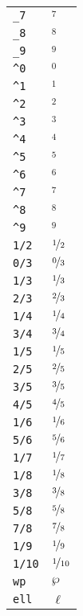 \begin{longtable}{ll}
\texttt{\_7}&${}_7 {}$\\
\texttt{\_8}&${}_8 {}$\\
\texttt{\_9}&${}_9 {}$\\
\texttt{\textasciicircum 0}&${}^0 {}$\\
\texttt{\textasciicircum 1}&${}^1 {}$\\
\texttt{\textasciicircum 2}&${}^2 {}$\\
\texttt{\textasciicircum 3}&${}^3 {}$\\
\texttt{\textasciicircum 4}&${}^4 {}$\\
\texttt{\textasciicircum 5}&${}^5 {}$\\
\texttt{\textasciicircum 6}&${}^6 {}$\\
\texttt{\textasciicircum 7}&${}^7 {}$\\
\texttt{\textasciicircum 8}&${}^8 {}$\\
\texttt{\textasciicircum 9}&${}^9 {}$\\
\texttt{1/2}&${}\nicefrac{1}{2} {}$\\
\texttt{0/3}&${}\nicefrac{0}{3} {}$\\
\texttt{1/3}&${}\nicefrac{1}{3} {}$\\
\texttt{2/3}&${}\nicefrac{2}{3} {}$\\
\texttt{1/4}&${}\nicefrac{1}{4} {}$\\
\texttt{3/4}&${}\nicefrac{3}{4} {}$\\
\texttt{1/5}&${}\nicefrac{1}{5} {}$\\
\texttt{2/5}&${}\nicefrac{2}{5} {}$\\
\texttt{3/5}&${}\nicefrac{3}{5} {}$\\
\texttt{4/5}&${}\nicefrac{4}{5} {}$\\
\texttt{1/6}&${}\nicefrac{1}{6} {}$\\
\texttt{5/6}&${}\nicefrac{5}{6} {}$\\
\texttt{1/7}&${}\nicefrac{1}{7} {}$\\
\texttt{1/8}&${}\nicefrac{1}{8} {}$\\
\texttt{3/8}&${}\nicefrac{3}{8} {}$\\
\texttt{5/8}&${}\nicefrac{5}{8} {}$\\
\texttt{7/8}&${}\nicefrac{7}{8} {}$\\
\texttt{1/9}&${}\nicefrac{1}{9} {}$\\
\texttt{1/10}&${}\nicefrac{1}{10} {}$\\
\texttt{wp}&${}\wp {}$\\
\texttt{ell}&${}\ell {}$\\

\end{longtable}
